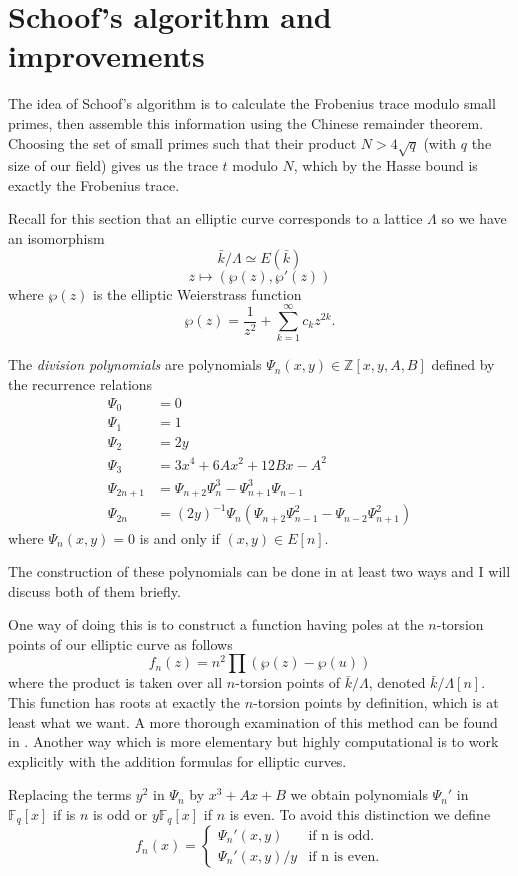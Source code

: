 \section{Schoof's algorithm and improvements}
The idea of Schoof's algorithm is to calculate the Frobenius trace modulo small primes,
then assemble this information using the Chinese remainder theorem. Choosing the set
of small primes such that their product $N > 4 \sqrt q$ (with $q$ the size of our
field) gives us the trace $t$ modulo $N$, which by the Hasse bound is exactly
the Frobenius trace.

Recall for this section that an elliptic curve corresponds to a lattice $\Lambda$
so we have an isomorphism
$$ \bar{k}/\Lambda \simeq E(\bar{k}) $$
$$ z \mapsto (\wp(z), \wp '(z)) $$
where $\wp(z)$ is the elliptic Weierstrass function
$$\wp(z) = \frac{1}{z^2} + \sum_{k=1}^\infty c_k z^{2k}. $$

\begin{mydef}
 The \emph{division polynomials} are polynomials $\Psi_n(x,y) \in \mathbb{Z}[x,y,A,B]$
defined by the recurrence relations
\begin{align*}
  \Psi_0 &= 0 \\
  \Psi_1 &= 1 \\
  \Psi_2 &= 2y \\
  \Psi_3 &= 3x^4 + 6Ax^2 + 12Bx - A^2 \\
  \Psi_{2n+1} &= \Psi_{n+2} \Psi_n^3 - \Psi_{n+1}^3 \Psi_{n-1} \\
  \Psi_{2n}   &= (2y)^{-1} \Psi_n(\Psi_{n+2} \Psi_{n-1}^2 - \Psi_{n-2} \Psi_{n+1}^2)
\end{align*}
where $\Psi_n(x,y) = 0$ is and only if $(x,y) \in E[n]$.
\end{mydef}
The construction of these polynomials can be done in at least two ways and I will discuss
both of them briefly.

One way of doing this is to construct
a function having poles at the $n$-torsion points of our elliptic curve as follows
$$ f_n(z) = n^2 \prod(\wp(z) - \wp(u)) $$
where the product is taken over all $n$-torsion points of $\bar{k}/\Lambda$, denoted
$\bar{k}/\Lambda[n]$. This function has roots at exactly the $n$-torsion points by definition,
which is at least what we want. A more thorough examination of this method can be found
in \cite{Lang}.
Another way which is more elementary but highly computational is to work explicitly
with the addition formulas for elliptic curves.

Replacing the terms $y^2$ in $\Psi_n$ by $x^3 + Ax + B$ we obtain polynomials $\Psi_n '$ in
$\mathbb{F}_q[x]$ if is $n$ is odd or $y \mathbb{F}_q[x]$ if $n$ is even. To avoid
this distinction we define
$$
f_n(x) = \begin{cases}
          \Psi_n '(x,y) & \text{if n is odd.} \\
	  \Psi_n '(x,y)/y & \text{if n is even.}
         \end{cases}
$$



